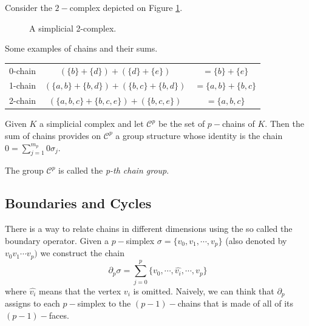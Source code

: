 \documentclass[
	fontsize=10pt, %
	twoside=false, %
	secnumdepth=1, %
]{kaobook}
\begin{document}
\begin{example}
Consider the $2-$complex depicted on Figure \ref{C2:Fig:2Complex}.

\begin{figure}[h]
\caption{A simplicial 2-complex.}
\label{C2:Fig:2Complex}
\end{figure}

Some examples of chains and their sums.

\begin{center}
\begin{tabular}{ccc}
0-chain & $(\{b\}+\{d\})+(\{d\}+\{e\})$ & $=\{b\}+\{e\}$ \\
1-chain & $(\{a,b\}+\{b,d\})+(\{b,c\}+\{b,d\})$ & $=\{a,b\}+\{b,c\}$\\
2-chain & $(\{a,b,c\}+\{b,c,e\})+(\{b,c,e\})$ & $=\{a,b,c\}$
\end{tabular}
\end{center}
\end{example}

\begin{lemma}
Given $K$ a simplicial complex and let $\mathcal{C}^p$ be the set of $p-$chains of $K.$ Then the sum of chains provides on $\mathcal{C}^p$ a group structure whose identity is the chain $0=\sum_{j=1}^{m_p} 0\sigma_j.$
\end{lemma}

\begin{definition}
The group $\mathcal{C}^p$ is called the \emph{p-th chain group}.
\end{definition}

\subsection{Boundaries and Cycles}

There is a way to relate chains in different dimensions using the so called the boundary operator. Given a $p-$simplex $\sigma=\{v_0,v_1,\cdots, v_p\}$ (also denoted by $v_0v_1\cdots v_p)$ we construct the chain $$\partial_p \sigma =\sum_{j=0}^p \{v_0,\cdots,\hat{v_i},\cdots,v_p\}$$ where $\hat{v_i}$ means that the vertex $v_i$ is omitted. Naively, we can think that $\partial_p$ assigns to each $p-$simplex to the $(p-1)-$chains that is made of all of its $(p-1)-$faces.
\end{document}
